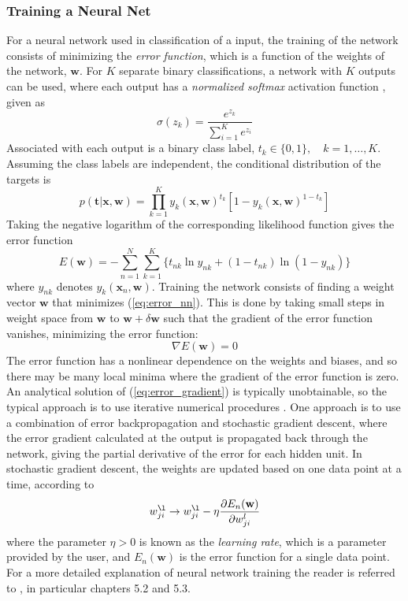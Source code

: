 \subsubsection{Training a Neural Net}
\label{section:training}
For a neural network used in classification of a input, the training of the network consists of minimizing the \textit{error function}, which is a function of the weights of the network, $\mathbf{w}$. For $K$ separate binary classifications, a network with $K$ outputs can be used, where each output has a \textit{normalized softmax} activation function \cite{machine_learning}, given as
\begin{equation}
\sigma(z_k) = \frac{e^{z_k}}{\sum_{i=1}^{K}e^{z_i}}
\end{equation} 
Associated with each output is a binary class label, $t_k\in\{0,1\},\quad k=1,\dots,K$. Assuming the class labels are independent, the conditional distribution of the targets is \cite{machine_learning}
\begin{equation}
p(\mathbf{t}|\mathbf{x},\mathbf{w})=\prod_{k=1}^{K}y_k(\mathbf{x},\mathbf{w})^{t_k}[1-y_k(\mathbf{x},\mathbf{w})^{1-t_k}]
\end{equation}
Taking the negative logarithm of the corresponding likelihood function gives the error function
\begin{equation}
\label{eq:error_nn}
E(\mathbf{w})=-\sum_{n=1}^{N}\sum_{k=1}^{K}\{t_{nk}\ln y_{nk}+(1-t_{nk})\ln(1-y_{nk})\}
\end{equation}
where $y_{nk}$ denotes $y_k(\mathbf{x}_n,\mathbf{w})$. Training the network consists of finding a weight vector $\mathbf{w}$ that minimizes (\ref{eq:error_nn}). This is done by taking small steps in weight space from $\mathbf{w}$ to $\mathbf{w}+\delta\mathbf{w}$ such that the gradient of the error function vanishes, minimizing the error function:
\begin{equation}
\label{eq:error_gradient}
\nabla E(\mathbf{w})=0
\end{equation}
The error function has a nonlinear dependence on the weights and biases, and so there may be many local minima where the gradient of the error function is zero. An analytical solution of (\ref{eq:error_gradient}) is typically unobtainable, so the typical approach is to use iterative numerical procedures \cite{machine_learning}. One approach is to use a combination of error backpropagation and stochastic gradient descent, where the error gradient calculated at the output is propagated back through the network, giving the partial derivative of the error for each hidden unit. In stochastic gradient descent, the weights are updated based on one data point at a time, according to 
\begin{equation}
w_{ji}^{\l}\rightarrow w_{ji}^{\l}-\eta \frac{\partial E_n(\mathbf{w})}{\partial w_{ji}^{l}}
\end{equation}
where the parameter $\eta > 0$ is known as the \textit{learning rate}, which is a parameter provided by the user, and $E_n(\mathbf{w})$ is the error function for a single data point. For a more detailed explanation of neural network training the reader is referred to \cite{machine_learning}, in particular chapters 5.2 and 5.3.

